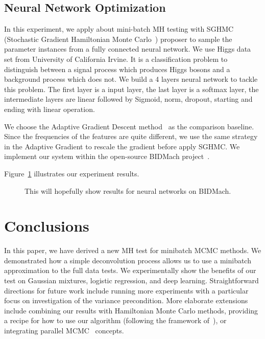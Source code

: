 \documentclass{article}
\begin{document}
\subsection{Neural Network Optimization}\label{ssec:nets}

In this experiment, we apply about mini-batch MH testing with SGHMC (Stochastic Gradient Hamiltonian
Monte Carlo~\cite{sghmc_2014}) proposer to sample the parameter instances from a fully connected
neural network. We use Higgs data set from University of California Irvine. It is a classification
problem to distinguish between a signal process which produces Higgs bosons and a background process
which does not. We build a 4 layers neural network to tackle this problem. The first layer is a
input layer, the last layer is a softmax layer, the intermediate layers are linear followed by
Sigmoid, norm, dropout, starting and ending with linear operation. 

We choose the Adaptive Gradient Descent method~\cite{adapGrad} as the comparison baseline. Since
the frequencies of the features are quite different, we use the same strategy in the Adaptive
Gradient to rescale the gradient before apply SGHMC. We implement our system within the open-source
BIDMach project~\cite{canny2013bidmach}.  

Figure~\ref{fig:nnet_fig} illustrates our experiment results.  

\begin{figure}[t]
    \centering
    \fbox{\rule[-.5cm]{0cm}{4cm} \rule[-.5cm]{4cm}{0cm}}
    \caption{This will hopefully show results for neural networks on BIDMach.}
    \label{fig:nnet_fig}
\end{figure}




\section{Conclusions}\label{sec:conclusion}

In this paper, we have derived a new MH test for minibatch MCMC methods. We demonstrated how a
simple deconvolution process allows us to use a minibatch approximation to the full data tests. We
experimentally show the benefits of our test on Gaussian mixtures, logistic regression, and deep
learning.  Straightforward directions for future work include running more experiments with a
particular focus on investigation of the variance precondition.  More elaborate extensions include
combining our results with Hamiltonian Monte Carlo methods, providing a recipe for how to use our
algorithm (following the framework of~\cite{sgmcmc_2015}), or integrating parallel
MCMC~\cite{conf/uai/AngelinoKWSA14,conf/icml/AhnSW14} concepts.
\end{document}
